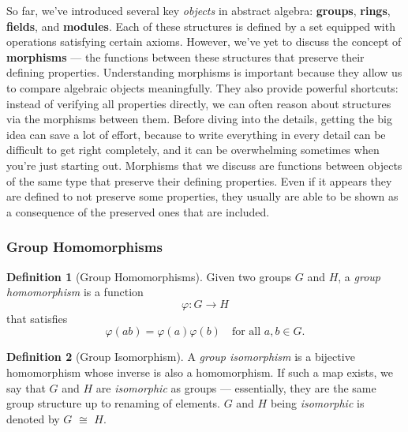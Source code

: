 \documentclass{article}
\theoremstyle{definition}
\newtheorem{definition}{Definition}[section]
\theoremstyle{definition}
\theoremstyle{definition}
\begin{document}
So far, we've introduced several key \textit{objects} in abstract algebra: \textbf{groups}, \textbf{rings}, \textbf{fields}, and \textbf{modules}. Each of these structures is defined by a set equipped with operations satisfying certain axioms. However, we’ve yet to discuss the concept of \textbf{morphisms} — the functions between these structures that preserve their defining properties.
\newline\newline
Understanding morphisms is important because they allow us to compare algebraic objects meaningfully. They also provide powerful shortcuts: instead of verifying all properties directly, we can often reason about structures via the morphisms between them.
\newline\newline
Before diving into the details, getting the big idea can save a lot of effort, because to write everything in every detail can be difficult to get right completely, and it can be overwhelming sometimes when you're just starting out.
\newline\newline
Morphisms that we discuss are functions between objects of the same type that preserve their defining properties. Even if it appears they are defined to not preserve some properties, they usually are able to be shown as a consequence of the preserved ones that are included.

\subsubsection{Group Homomorphisms}

\begin{definition}[Group Homomorphisms]

Given two groups \( G \) and \( H \), a \emph{group homomorphism} is a function
\[
\varphi : G \to H
\]
that satisfies
\[
\varphi(ab) = \varphi(a)\varphi(b) \quad \text{for all } a, b \in G.
\]
\end{definition}
\begin{definition}[Group Isomorphism]
    A \emph{group isomorphism} is a bijective homomorphism whose inverse is also a homomorphism. If such a map exists, we say that \( G \) and \( H \) are \emph{isomorphic} as groups — essentially, they are the same group structure up to renaming of elements. \( G \) and \( H \) being \emph{isomorphic} is denoted by  \( G \) $\cong$ \( H \).
\end{definition}
 
\end{document}
